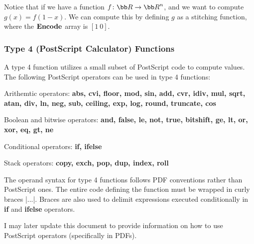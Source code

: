 Notice that if we have a function $f\colon{\bb R}\to{\bb R}^n$, and we want to compute $g(x)=f(1-x)$.
We can compute this by defining $g$ as a stitching function, where the ${\bf Encode}$ array is $[1\ 0]$.

\subsubsection{Type 4 (PostScript Calculator) Functions}

A type 4 function utilizes a small subset of PostScript code to compute values.
The following PostScript operators can be used in type 4 functions:

\blist
    \item Arithemtic operators: {\bf abs, cvi, floor, mod, sin, add, cvr, idiv, mul, sqrt, atan, div, ln,
        neg, sub, ceiling, exp, log, round, truncate, cos}
    \item Boolean and bitwise operators: {\bf and, false, le, not, true, bitshift, ge, lt, or, xor, eq, gt, ne}
    \item Conditional operators: {\bf if, ifelse}
    \item Stack operators: {\bf copy, exch, pop, dup, index, roll}
\elist

The operand syntax for type 4 functions follows PDF conventions rather than PostScript ones.
The entire code defining the function must be wrapped in curly braces \inlinecode|{...}|.
Braces are also used to delimit expressions executed conditionally in {\bf if} and {\bf ifelse} operators.

I may later update this document to provide information on how to use PostScript operators (specifically in
PDFs).

